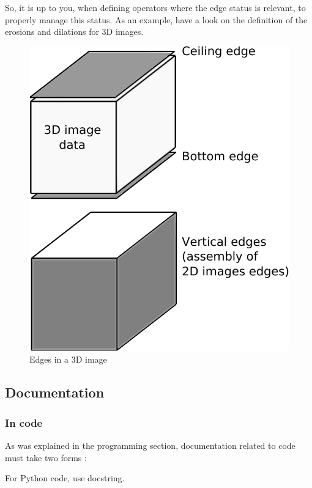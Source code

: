 \documentclass[a4paper,10pt,oneside]{article}
\begin{document}
So, it is up to you, when defining operators where the edge status is relevant, to properly
manage this status. As an example, have a look on the definition of the erosions
and dilations for 3D images.\par

\begin{figure}
\centering
\includegraphics[scale=0.6]{figures/3D_edges.pdf}
\caption{Edges in a 3D image}
\label{fig:3D_edges}
\end{figure}

\subsection{Documentation}

\subsubsection{In code}

As was explained in the programming section, documentation related
to code must take two forms :

For Python code, use docstring.
\end{document}
